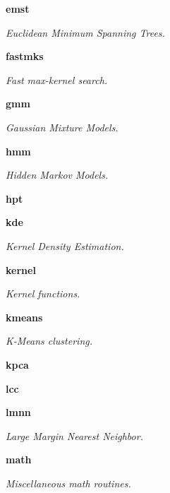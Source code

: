 \begin{DoxyCompactItemize}
 \textbf{ emst}
\begin{DoxyCompactList}\small\item\em Euclidean Minimum Spanning Trees. \end{DoxyCompactList}\item 
 \textbf{ fastmks}
\begin{DoxyCompactList}\small\item\em Fast max-\/kernel search. \end{DoxyCompactList}\item 
 \textbf{ gmm}
\begin{DoxyCompactList}\small\item\em Gaussian Mixture Models. \end{DoxyCompactList}\item 
 \textbf{ hmm}
\begin{DoxyCompactList}\small\item\em Hidden Markov Models. \end{DoxyCompactList}\item 
 \textbf{ hpt}
\item 
 \textbf{ kde}
\begin{DoxyCompactList}\small\item\em Kernel Density Estimation. \end{DoxyCompactList}\item 
 \textbf{ kernel}
\begin{DoxyCompactList}\small\item\em Kernel functions. \end{DoxyCompactList}\item 
 \textbf{ kmeans}
\begin{DoxyCompactList}\small\item\em K-\/\+Means clustering. \end{DoxyCompactList}\item 
 \textbf{ kpca}
\item 
 \textbf{ lcc}
\item 
 \textbf{ lmnn}
\begin{DoxyCompactList}\small\item\em Large Margin Nearest Neighbor. \end{DoxyCompactList}\item 
 \textbf{ math}
\begin{DoxyCompactList}\small\item\em Miscellaneous math routines. \end{DoxyCompactList}\item 

\end{DoxyCompactItemize}
